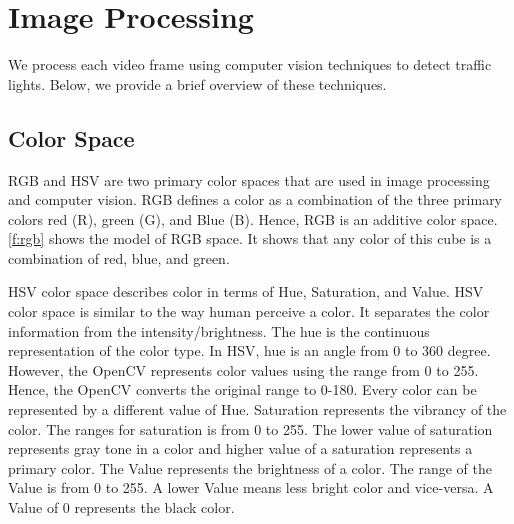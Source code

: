 \section {Image Processing}
We process each video frame using computer vision techniques to detect traffic lights. 
Below, we provide a brief overview of these techniques. 

\subsection{Color Space}
RGB  and HSV  are two primary color spaces that are used in image processing and computer vision.
RGB defines a color as a combination of the three primary colors red (R), green (G), and Blue (B).
Hence, RGB is an additive color space.
\ref{f:rgb} shows the model of RGB space.
It shows that any color of this cube is a combination of red, blue, and green.

HSV color space describes color in terms of Hue, Saturation, and Value.
HSV color space is similar to the way human perceive a color.
It separates the color information from the intensity/brightness.
The hue is the continuous representation of the color type. 
In HSV, hue is an angle from 0 to 360 degree. 
However, the OpenCV  represents color values using the range from 0 to 255. 
Hence, the OpenCV converts the original range to 0-180.
Every color can be represented by a different value of Hue.
Saturation represents the vibrancy of the color.
The ranges for saturation is from 0 to 255.
The lower value of saturation represents gray tone in a color and higher value of a saturation represents a primary color.
The Value represents the brightness of a color.
The range of the Value is from 0 to 255.
A lower Value means less bright color and vice-versa.
A Value of 0 represents the black color.

